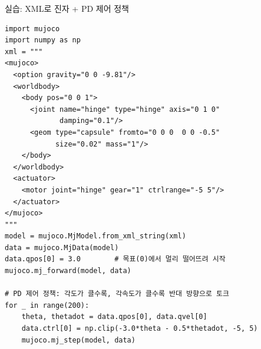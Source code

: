\begin{frame}[fragile]{실습: XML로 진자 + PD 제어 정책}
\begin{lstlisting}
import mujoco
import numpy as np
xml = """
<mujoco>
  <option gravity="0 0 -9.81"/>
  <worldbody>
    <body pos="0 0 1">
      <joint name="hinge" type="hinge" axis="0 1 0"
             damping="0.1"/>
      <geom type="capsule" fromto="0 0 0  0 0 -0.5"
            size="0.02" mass="1"/>
    </body>
  </worldbody>
  <actuator>
    <motor joint="hinge" gear="1" ctrlrange="-5 5"/>
  </actuator>
</mujoco>
"""
model = mujoco.MjModel.from_xml_string(xml)
data = mujoco.MjData(model)
data.qpos[0] = 3.0        # 목표(0)에서 멀리 떨어뜨려 시작
mujoco.mj_forward(model, data)

# PD 제어 정책: 각도가 클수록, 각속도가 클수록 반대 방향으로 토크
for _ in range(200):
    theta, thetadot = data.qpos[0], data.qvel[0]
    data.ctrl[0] = np.clip(-3.0*theta - 0.5*thetadot, -5, 5)
    mujoco.mj_step(model, data)
\end{lstlisting}
\end{frame}
